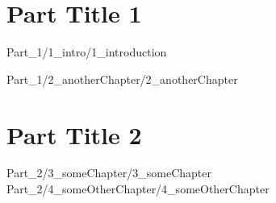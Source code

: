 \documentclass[titlepage,chapternotes]{utsthesis}
\begin{document}
\bibliographyunit[\chapter]

\Year{\thesisDate}
\School{\UTS}

\prelimpages
%
\titlepage
\thesissignaturepage
\dedication{Dedication}
\abstract{
    \blindtext
}

\acknowledgments{
    \blindtext
}
\tableofcontents
\listoffigures
\listoftables
\abbreviations
\textpages
{} %
%

\part{Part Title 1}

{Part_1/1_intro/1_introduction}

{Part_1/2_anotherChapter/2_anotherChapter}

\part{Part Title 2}

{Part_2/3_someChapter/3_someChapter}
{Part_2/4_someOtherChapter/4_someOtherChapter}
\end{document}
